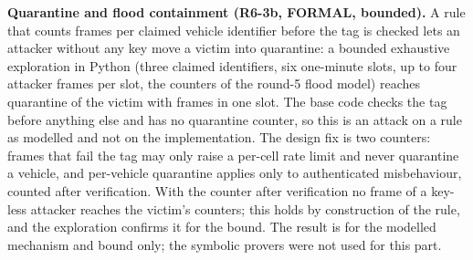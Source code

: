 \documentclass{ieeeaccess}
\begin{document}
\textbf{Quarantine and flood containment (R6-3b, FORMAL, bounded).} A rule that counts frames per claimed vehicle identifier before the tag is checked lets an attacker without any key move a victim into quarantine: a bounded exhaustive exploration in Python (three claimed identifiers, six one-minute slots, up to four attacker frames per slot, the counters of the round-5 flood model) reaches quarantine of the victim with \RSixQuarFrames{} frames in one slot. The base code checks the tag before anything else and has no quarantine counter, so this is an attack on a rule as modelled and not on the implementation. The design fix is two counters: frames that fail the tag may only raise a per-cell rate limit and never quarantine a vehicle, and per-vehicle quarantine applies only to authenticated misbehaviour, counted after verification. With the counter after verification no frame of a key-less attacker reaches the victim's counters; this holds by construction of the rule, and the exploration confirms it for the bound. The result is for the modelled mechanism and bound only; the symbolic provers were not used for this part.
\end{document}
